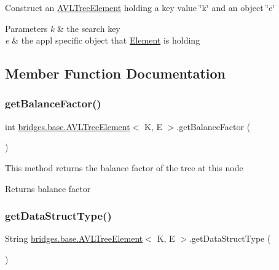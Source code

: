 Construct an \hyperlink{classbridges_1_1base_1_1_a_v_l_tree_element}{A\+V\+L\+Tree\+Element} holding a key value \char`\"{}k\char`\"{} and an object \char`\"{}e\char`\"{}


\begin{DoxyParams}{Parameters}
{\em k} & the search key \\
\hline
{\em e} & the appl specific object that \hyperlink{classbridges_1_1base_1_1_element}{Element} is holding \\
\hline
\end{DoxyParams}


\subsection{Member Function Documentation}
\mbox{\label{classbridges_1_1base_1_1_a_v_l_tree_element_a0478ca0351cd714e8f7b8e49703990c8}} 
\subsubsection{\texorpdfstring{get\+Balance\+Factor()}{getBalanceFactor()}}
{\footnotesize\ttfamily int \hyperlink{classbridges_1_1base_1_1_a_v_l_tree_element}{bridges.\+base.\+A\+V\+L\+Tree\+Element}$<$ K, E $>$.get\+Balance\+Factor (\begin{DoxyParamCaption}{ }\end{DoxyParamCaption})}

This method returns the balance factor of the tree at this node

\begin{DoxyReturn}{Returns}
balance factor 
\end{DoxyReturn}
\mbox{\label{classbridges_1_1base_1_1_a_v_l_tree_element_abdd9e63de10732ef46bd5d531bd7f9d8}} 
\subsubsection{\texorpdfstring{get\+Data\+Struct\+Type()}{getDataStructType()}}
{\footnotesize\ttfamily String \hyperlink{classbridges_1_1base_1_1_a_v_l_tree_element}{bridges.\+base.\+A\+V\+L\+Tree\+Element}$<$ K, E $>$.get\+Data\+Struct\+Type (\begin{DoxyParamCaption}{ }\end{DoxyParamCaption})}

